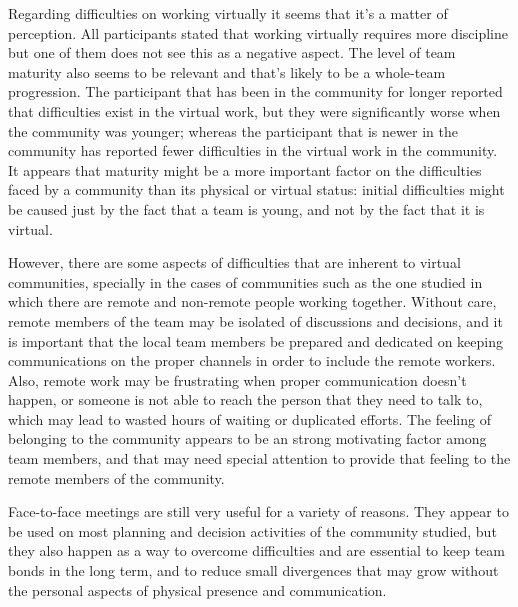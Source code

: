 \documentclass{sigchi}
\begin{document}
Regarding difficulties on working virtually it seems that it's a matter of perception. All participants stated that working virtually requires more discipline but one of them does not see this as a negative aspect. The level of team maturity also seems to be relevant and that's likely to be a whole-team progression. The participant that has been in the community for longer reported that difficulties exist in the virtual work, but they were significantly worse when the community was younger; whereas the participant that is newer in the community has reported fewer difficulties in the virtual work in the community. It appears that maturity might be a more important factor on the difficulties faced by a community than its physical or virtual status: initial difficulties might be caused just by the fact that a team is young, and not by the fact that it is virtual.

However, there are some aspects of difficulties that are inherent to virtual communities, specially in the cases of communities such as the one studied in which there are remote and non-remote people working together. Without care, remote members of the team may be isolated of discussions and decisions, and it is important that the local team members be prepared and dedicated on keeping communications on the proper channels in order to include the remote workers. Also, remote work may be frustrating when proper communication doesn't happen, or someone is not able to reach the person that they need to talk to, which may lead to wasted hours of waiting or duplicated efforts. The feeling of belonging to the community appears to be an strong motivating factor among team members, and that may need special attention to provide that feeling to the remote members of the community.

Face-to-face meetings are still very useful for a variety of reasons. They appear to be used on most planning and decision activities of the community studied, but they also happen as a way to overcome difficulties and are essential to keep team bonds in the long term, and to reduce small divergences that may grow without the personal aspects of physical presence and communication.
\end{document}
